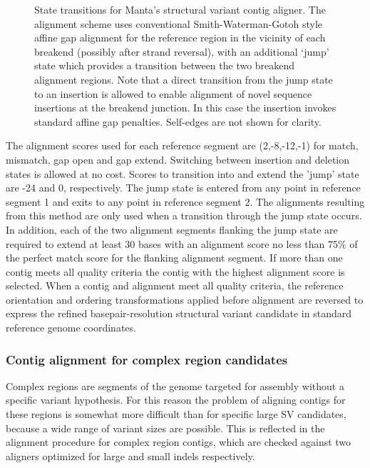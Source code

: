 \documentclass{article}
\begin{document}
\begin{figure}[!tpb]
\centerline{
}
\caption{State transitions for Manta's structural variant contig aligner. The alignment scheme uses conventional Smith-Waterman-Gotoh style affine gap alignment for the reference region in the vicinity of each breakend (possibly after strand reversal), with an additional `jump' state which provides a transition between the two breakend alignment regions. Note that a direct transition from the jump state to an insertion is allowed to enable alignment of novel sequence insertions at the breakend junction. In this case the insertion invokes standard affine gap penalties. Self-edges are not shown for clarity.}
\label{fig:jumpstate}
\end{figure}

The alignment scores used for each reference segment are (2,-8,-12,-1) for match, mismatch, gap open and gap extend. Switching between insertion and deletion states is allowed at no cost. Scores to transition into and extend the 'jump' state are -24 and 0, respectively. The jump state is entered from any point in reference segment 1 and exits to any point in reference segment 2. The alignments resulting from this method are only used when a transition through the jump state occurs. In addition, each of the two alignment segments flanking the jump state are required to extend at least 30 bases with an alignment score no less than 75\% of the perfect match score for the flanking alignment segment. If more than one contig meets all quality criteria the contig with the highest alignment score is selected. When a contig and alignment meet all quality criteria, the reference orientation and ordering transformations applied before alignment are reversed to express the refined basepair-resolution structural variant candidate in standard reference genome coordinates.


\subsubsection{Contig alignment for complex region candidates}
Complex regions are segments of the genome targeted for assembly without a specific variant hypothesis. For this reason the problem of aligning contigs for these regions is somewhat more difficult than for specific large SV candidates, because a wide range of variant sizes are possible. This is reflected in the alignment procedure for complex region contigs, which are checked against two aligners optimized for large and small indels respectively.
\end{document}
